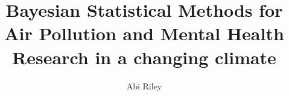 \documentclass[a4paper,11pt,twoside]{report}
\begin{document}
\title{\LARGE {\bf Bayesian Statistical Methods for Air Pollution and Mental Health Research in a changing climate}\\
 \vspace*{6mm}
}

\author{Abi Riley}

\normallinespacing
\maketitle

\preface




%
%

\body
\onehalfspacing



%
%




\appendix








\end{document}

